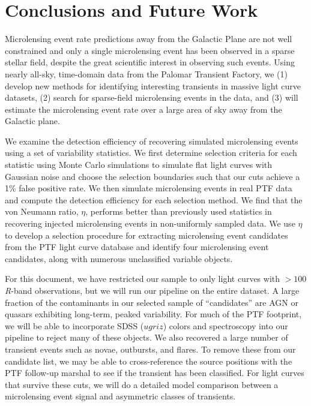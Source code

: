 \documentclass{emulateapj}
\begin{document}
\section{Conclusions and Future Work}
Microlensing event rate predictions away from the Galactic Plane are not well constrained and only a single microlensing event has been observed in a sparse stellar field, despite the great scientific interest in observing such events. Using nearly all-sky, time-domain data from the Palomar Transient Factory, we (1) develop new methods for identifying interesting transients in massive light curve datasets, (2) search for sparse-field microlensing events in the data, and (3) will estimate the microlensing event rate over a large area of sky away from the Galactic plane. 

We examine the detection efficiency of recovering simulated microlensing events using a set of variability statistics. We first determine selection criteria for each statistic using Monte Carlo simulations to simulate flat light curves with Gaussian noise and choose the selection boundaries such that our cuts achieve a 1\% false positive rate. We then simulate microlensing events in real PTF data and compute the detection efficiency for each selection method. We find that the von Neumann ratio, $\eta$, performs better than previously used statistics in recovering injected microlensing events in non-uniformly sampled data. We use $\eta$ to develop a selection procedure for extracting microlensing event candidates from the PTF light curve database and identify four microlensing event candidates, along with numerous unclassified variable objects.

For this document, we have restricted our sample to only light curves with $>100$ \textit{R}-band observations, but we will run our pipeline on the entire dataset. A large fraction of the contaminants in our selected sample of ``candidates'' are AGN or quasars exhibiting long-term, peaked variability. For much of the PTF footprint, we will be able to incorporate SDSS ($ugriz$) colors and spectroscopy into our pipeline to reject many of these objects. We also recovered a large number of transient events such as novae, outbursts, and flares. To remove these from our candidate list, we may be able to cross-reference the source positions with the PTF follow-up marshal to see if the transient has been classified. For light curves that survive these cuts, we will do a detailed model comparison between a microlensing event signal and asymmetric classes of transients. 
\end{document}

